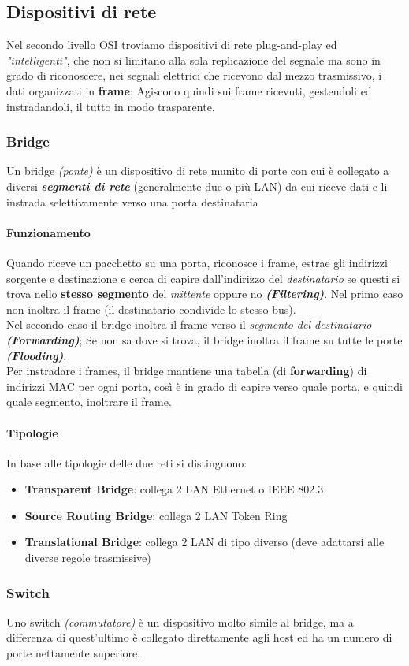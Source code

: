 \documentclass[a4paper,11pt]{article}
\def\para#1{\paragraph{#1}\label{#1}}
\begin{document}
\subsection{Dispositivi di rete}
Nel secondo livello OSI troviamo dispositivi di rete plug-and-play ed \textit{"intelligenti"}, che non si limitano alla sola replicazione del segnale ma sono in grado di riconoscere, nei segnali elettrici che ricevono dal mezzo trasmissivo, i dati organizzati in \textbf{frame}; Agiscono quindi sui frame ricevuti, gestendoli ed instradandoli, il tutto in modo trasparente.
\subsubsection{Bridge} Un bridge \textit{(ponte)} è un dispositivo di rete munito di porte con cui è collegato a diversi \textbf{\textit{segmenti di rete}} (generalmente due o più LAN) da cui riceve dati e li instrada selettivamente verso una porta destinataria
\paragraph{Funzionamento} Quando riceve un pacchetto su una porta, riconosce i frame, estrae gli indirizzi sorgente e destinazione e cerca di capire dall'indirizzo del \textit{destinatario} se questi si trova nello \textbf{stesso segmento} del \textit{mittente} oppure no \textbf{\textit{(Filtering)}}. Nel primo caso non inoltra il frame (il destinatario condivide lo stesso bus). \\Nel secondo caso il bridge inoltra il frame verso il \textit{segmento del destinatario} \textbf{\textit{(Forwarding)}}; Se non sa dove si trova, il bridge inoltra il frame su tutte le porte \textbf{\textit{(Flooding)}}. \\Per instradare i frames, il bridge mantiene una tabella (di \textbf{forwarding}) di indirizzi MAC per ogni porta, così è in grado di capire verso quale porta, e quindi quale segmento, inoltrare il frame. 
\para{Tipologie} In base alle tipologie delle due reti si distinguono:
\begin{itemize}
\item \textbf{Transparent Bridge}: collega 2 LAN Ethernet o IEEE 802.3
\item \textbf{Source Routing Bridge}: collega 2 LAN Token Ring
\item \textbf{Translational Bridge}: collega 2 LAN di tipo diverso (deve adattarsi alle diverse regole trasmissive)
\end{itemize}
\subsubsection{Switch} Uno switch \textit{(commutatore)} è un dispositivo molto simile al bridge, ma a differenza di quest'ultimo è collegato direttamente agli host ed ha un numero di porte nettamente superiore.
\end{document}
